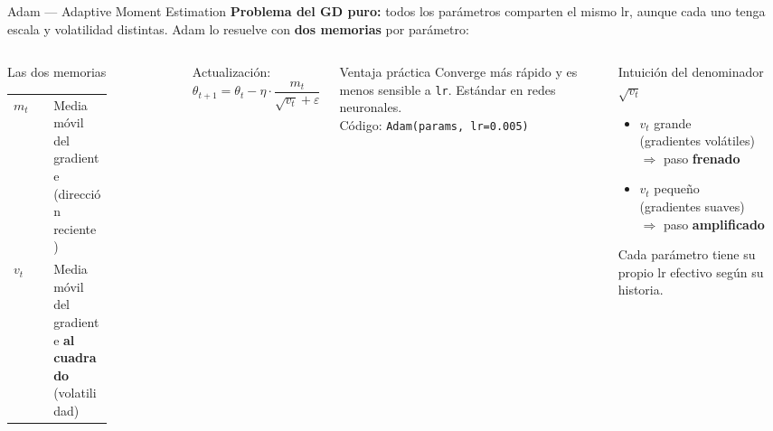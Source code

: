 \documentclass[10pt]{beamer}
\begin{document}
\begin{frame}{Adam — Adaptive Moment Estimation}
\small
\textbf{Problema del GD puro:} todos los parámetros comparten el mismo lr, aunque cada uno tenga escala y volatilidad distintas. Adam lo resuelve con \textbf{dos memorias} por parámetro:

\begin{columns}

\begin{block}{Las dos memorias}
  \begin{tabular}{lp{0.60\linewidth}}
    $m_t$ & Media móvil del gradiente (dirección reciente) \\[4pt]
    $v_t$ & Media móvil del gradiente \textbf{al cuadrado} (volatilidad)
  \end{tabular}
\end{block}

\smallskip
Actualización:
\[
  \theta_{t+1} = \theta_t - \eta \cdot \frac{m_t}{\sqrt{v_t} + \varepsilon}
\]

\smallskip
\begin{block}{Ventaja práctica}
  Converge más rápido y es menos sensible a \texttt{lr}. Estándar en redes neuronales.\\
  Código: \texttt{Adam(params, lr=0.005)}
\end{block}

\begin{alertblock}{Intuición del denominador $\sqrt{v_t}$}
  \begin{itemize}\itemsep4pt
    \item $v_t$ grande\\(gradientes volátiles)\\$\Rightarrow$ paso \textbf{frenado}
    \item $v_t$ pequeño\\(gradientes suaves)\\$\Rightarrow$ paso \textbf{amplificado}
  \end{itemize}
  \smallskip
  Cada parámetro tiene su propio lr efectivo según su historia.
\end{alertblock}
\end{columns}

\end{frame}
\end{document}
